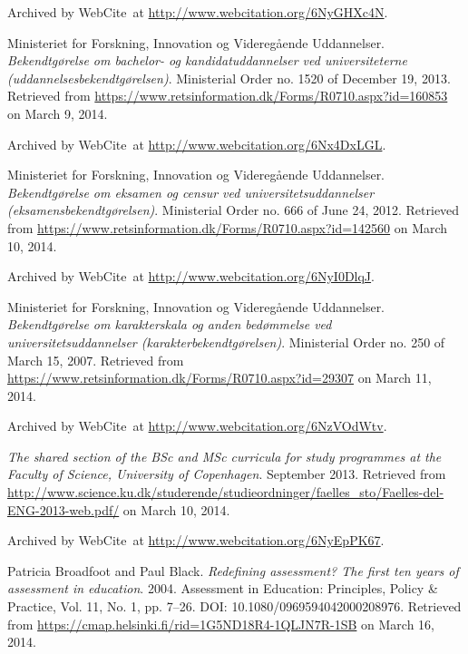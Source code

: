 \begin{thebibliography}{9}
Archived by WebCite\textsuperscript{\textregistered}\ at
\url{http://www.webcitation.org/6NyGHXc4N}.


Ministeriet for Forskning, Innovation og Videregående Uddannelser.
\emph{Bekendtgørelse om bachelor- og kandidatuddannelser ved universiteterne
(uddannelsesbekendtgørelsen)}. Ministerial Order no. 1520 of December 19,
2013.  Retrieved from
\url{https://www.retsinformation.dk/Forms/R0710.aspx?id=160853} on March 9,
2014.

Archived by WebCite\textsuperscript{\textregistered}\ at
\url{http://www.webcitation.org/6Nx4DxLGL}.


Ministeriet for Forskning, Innovation og Videregående Uddannelser.
\emph{Bekendtgørelse om eksamen og censur ved universitetsuddannelser
(eksamensbekendtgørelsen)}. Ministerial Order no. 666 of June 24, 2012.
Retrieved from \url{https://www.retsinformation.dk/Forms/R0710.aspx?id=142560}
on March 10, 2014.

Archived by WebCite\textsuperscript{\textregistered}\ at
\url{http://www.webcitation.org/6NyI0DlqJ}.


Ministeriet for Forskning, Innovation og Videregående Uddannelser.
\emph{Bekendtgørelse om karakterskala og anden bedømmelse ved
universitetsuddannelser (karakterbekendtgørelsen)}. Ministerial Order no. 250
of March 15, 2007.  Retrieved from
\url{https://www.retsinformation.dk/Forms/R0710.aspx?id=29307} on March 11,
2014.

Archived by WebCite\textsuperscript{\textregistered}\ at
\url{http://www.webcitation.org/6NzVOdWtv}.


\emph{The shared section of the BSc and MSc curricula for study programmes at
the Faculty of Science, University of Copenhagen}. September 2013. Retrieved
from
\url{http://www.science.ku.dk/studerende/studieordninger/faelles_sto/Faelles-del-ENG-2013-web.pdf/}
on March 10, 2014.

Archived by WebCite\textsuperscript{\textregistered}\ at
\url{http://www.webcitation.org/6NyEpPK67}.


Patricia Broadfoot and Paul Black. \emph{Redefining assessment? The first ten
years of assessment in education}. 2004. Assessment in Education: Principles,
Policy \& Practice, Vol. 11, No. 1, pp. 7--26. DOI:
10.1080/0969594042000208976. Retrieved from
\url{https://cmap.helsinki.fi/rid=1G5ND18R4-1QLJN7R-1SB} on March 16, 2014.


\end{thebibliography}
